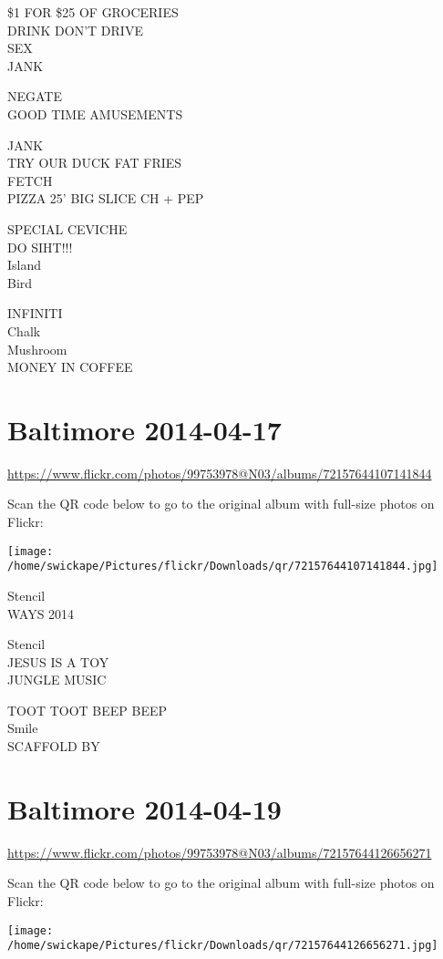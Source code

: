 \documentclass[10pt,letterpaper]{article}
\begin{document}
\$1 FOR \$25 OF GROCERIES\\
DRINK DON'T DRIVE\\
SEX\\
JANK

NEGATE\\
GOOD TIME AMUSEMENTS

JANK\\
TRY OUR DUCK FAT FRIES\\
FETCH\\
PIZZA 25' BIG SLICE CH + PEP

SPECIAL CEVICHE\\
DO SIHT!!!\\
Island\\
Bird

INFINITI\\
Chalk\\
Mushroom\\
MONEY IN COFFEE


\section*{Baltimore 2014-04-17}

\url{https://www.flickr.com/photos/99753978@N03/albums/72157644107141844}

Scan the QR code below to go to the original album with full-size photos on Flickr:

\texttt{[image: /home/swickape/Pictures/flickr/Downloads/qr/72157644107141844.jpg]}


Stencil\\
WAYS 2014

Stencil\\
JESUS IS A TOY\\
JUNGLE MUSIC

TOOT TOOT BEEP BEEP\\
Smile\\
SCAFFOLD BY


\section*{Baltimore 2014-04-19}

\url{https://www.flickr.com/photos/99753978@N03/albums/72157644126656271}

Scan the QR code below to go to the original album with full-size photos on Flickr:

\texttt{[image: /home/swickape/Pictures/flickr/Downloads/qr/72157644126656271.jpg]}
\end{document}

